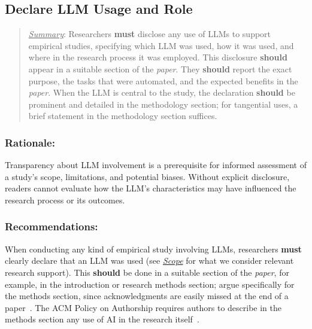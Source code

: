 \documentclass[smallextended]{svjour3}
\newcommand{\must}{\textbf{must}\xspace}
\newcommand{\should}{\textbf{should}\xspace}
\newcommand{\summary}{\underline{\emph{Summary}}\xspace}
\newcommand{\summary}{\textbf{\emph{Summary}}\xspace}
\newcommand{\paper}{\emph{paper}\xspace}
\newcommand{\paper}{\emph{paper}\xspace}
\newenvironment{framed}{\begin{quote}}{\end{quote}}
\newcommand{\scope}{\hyperref[sec:scope]{\mbox{\emph{Scope}}}\xspace}
\newcommand{\scope}{\href{/scope/}{\emph{Scope}}\xspace}
\newcommand{\guidelinesubsubsection}[1]{\subsubsection{\bfseries #1:}}
\newcommand{\guidelinesubsubsection}[1]{\subsubsection{#1}}
\begin{document}
\subsection{Declare LLM Usage and Role}
\label{sec:declare-llm-usage-and-role}

\vspace{0.5\baselineskip}
\begin{framed}
\summary: %
Researchers \must disclose any use of LLMs to support empirical studies, specifying which LLM was used, how it was used, and where in the research process it was employed. This disclosure \should appear in a suitable section of the \paper. They \should report the exact purpose, the tasks that were automated, and the expected benefits in the \paper. When the LLM is central to the study, the declaration \should be prominent and detailed in the methodology section; for tangential uses, a brief statement in the methodology section suffices.
\end{framed}

\guidelinesubsubsection{Rationale}

Transparency about LLM involvement is a prerequisite for informed assessment of a study's scope, limitations, and potential biases.
Without explicit disclosure, readers cannot evaluate how the LLM's characteristics may have influenced the research process or its outcomes.

\guidelinesubsubsection{Recommendations}

When conducting any kind of empirical study involving LLMs, researchers \must clearly declare that an LLM was used (see \scope for what we consider relevant research support).
This \should be done in a suitable section of the \paper, for example, in the introduction or research methods section; \citeauthor{cheng2025writing} argue specifically for the methods section, since acknowledgments are easily missed at the end of a paper~\cite{cheng2025writing}.
The ACM Policy on Authorship requires authors to describe in the methods section any use of AI in the research itself~\cite{ACM2026}.
\end{document}
